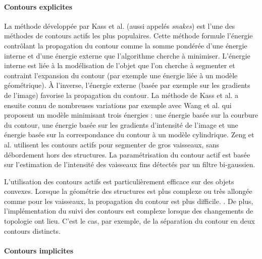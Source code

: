 
      \paragraph{Contours explicites}

      La méthode développée par Kass et al. \cite{Kass1988_snakes} (aussi appelés \textit{snakes}) est l'une des méthodes de contours actifs les plus populaires. Cette méthode formule l'énergie contrôlant la propagation du contour comme la somme pondérée d'une énergie interne et d'une énergie externe que l'algorithme cherche à minimiser. L'énergie interne est liée à la modélisation de l'objet que l'on cherche à segmenter et contraint l'expansion du contour (par exemple une énergie liée à un modèle géométrique). À l'inverse, l'énergie externe (basée par exemple sur les gradients de l'image) favorise la propagation du contour. La méthode de Kass et al. a ensuite connu de nombreuses variations par exemple avec Wang et al. \cite{Wang2012_vessel_level_set} qui proposent un modèle minimisant trois énergies : une énergie basée sur la courbure du contour, une énergie basée sur les gradients d'intensité de l'image et une énergie basée sur la correspondance du contour à un modèle cylindrique. Zeng et al. \cite{Zeng2018_liver_hybrid_active_contour_region_growing} utilisent les contours actifs pour segmenter de gros vaisseaux, sans débordement hors des structures. La paramétrisation du contour actif est basée sur l'estimation de l'intensité des vaisseaux fins détectés par un filtre bi-gaussien.

      L'utilisation des contours actifs est particulièrement efficace sur des objets convexes. Lorsque la géométrie des structures est plus complexe ou très allongée comme pour les vaisseaux, la propagation du contour est plus difficile. . De plus, l'implémentation du suivi des contours est complexe lorsque des changements de topologie ont lieu. C'est le cas, par exemple, de la séparation du contour en deux contours distincts.

      \paragraph{Contours implicites} 

